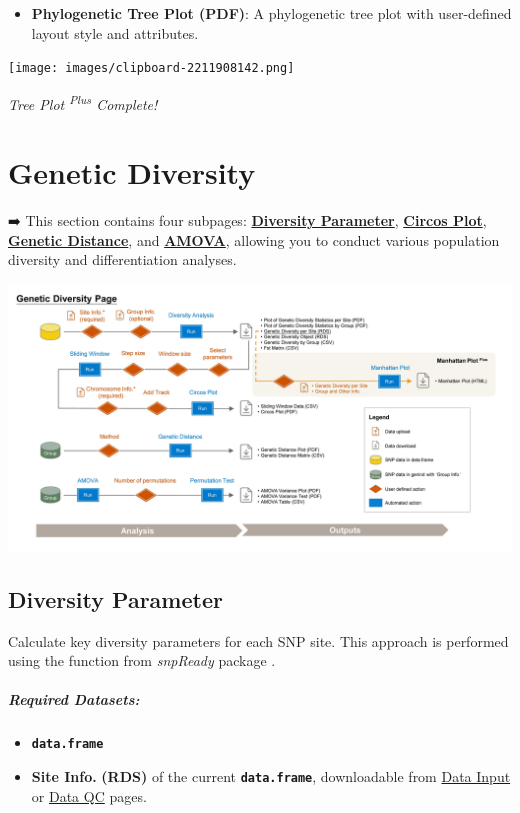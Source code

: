 \documentclass[
]{book}
\providecommand{\tightlist}{%
  \setlength{\itemsep}{0pt}\setlength{\parskip}{0pt}}
\begin{document}
\begin{itemize}
\tightlist
\item
  \textbf{Phylogenetic Tree Plot (PDF)}: A phylogenetic tree plot with user-defined layout style and attributes.
\end{itemize}

\texttt{[image: images/clipboard-2211908142.png]}

\emph{Tree Plot \textsuperscript{Plus} Complete!}

\chapter{Genetic Diversity}\label{sec-genetic-diversity}

➡️ This section contains four subpages: \ul{\textbf{Diversity Parameter}}, \ul{\textbf{Circos Plot}}, \ul{\textbf{Genetic Distance}}, and \ul{\textbf{AMOVA}}, allowing you to conduct various population diversity and differentiation analyses.

\includegraphics{images/Supp. Fig. 1-5_頁面_3.jpg}

\section{Diversity Parameter}\label{diversity-parameter}

Calculate key diversity parameters for each SNP site. This approach is performed using the function from \emph{snpReady} package \citep{granato2018}.

\paragraph*{Required Datasets:}\label{required-datasets}

\begin{itemize}
\tightlist
\item
  {\textbf{\texttt{data.frame}}}
\item
  \textbf{Site Info.} \textbf{(RDS)} of the current \textbf{\texttt{data.frame}}, downloadable from \ul{Data Input} or \ul{Data QC} pages.
\end{itemize}
\end{document}
